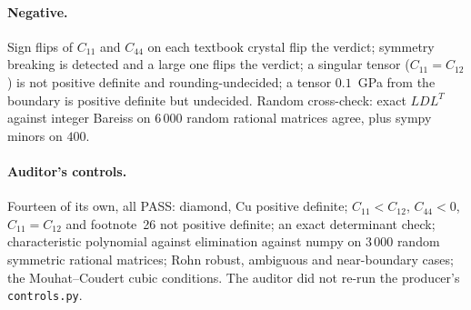 \documentclass[10pt]{article}
\begin{document}
\paragraph{Negative.} Sign flips of $C_{11}$ and $C_{44}$ on each textbook crystal flip the verdict; symmetry breaking is detected and a large one flips the verdict; a singular tensor ($C_{11}=C_{12}$) is not positive definite and rounding-undecided; a tensor $0.1$~GPa from the boundary is positive definite but undecided. Random cross-check: exact $LDL^T$ against integer Bareiss on $6\,000$ random rational matrices agree, plus sympy minors on $400$.
\paragraph{Auditor's controls.} Fourteen of its own, all PASS: diamond, Cu positive definite; $C_{11}<C_{12}$, $C_{44}<0$, $C_{11}=C_{12}$ and footnote~26 not positive definite; an exact determinant check; characteristic polynomial against elimination against numpy on $3\,000$ random symmetric rational matrices; Rohn robust, ambiguous and near-boundary cases; the Mouhat--Coudert cubic conditions. The auditor did not re-run the producer's \texttt{controls.py}.

\end{document}
